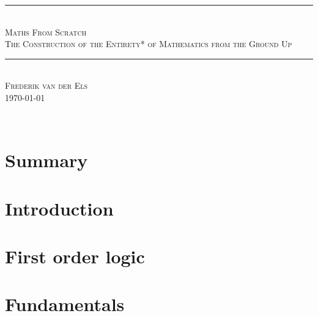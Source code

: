 \documentclass[11pt, a4paper]{report}
\theoremstyle{definition}
\begin{document}
\begin{titlepage}
    \newcommand{\HRule}{\rule{\linewidth}{0.5mm}}

    \begin{center}  
        \HRule \\[0.4cm]
        \textsc{\LARGE Maths From Scratch} \\[0.5cm]
        \textsc{\Large The Construction of the Entirety* of Mathematics from the Ground Up} \\[0.1cm]
        \HRule \\[1.5cm]

        {\large \textsc{Frederik van der Els}} \\[1.5cm]

        {\large \today} \\
    \end{center}
\end{titlepage}

\newpage
\thispagestyle{empty}
~

\chapter*{Summary}\label{chap:summary}


\newpage
\tableofcontents

\chapter*{Introduction}\label{chap:introduction}


\setcounter{chapter}{-1}
\chapter{First order logic}\label{chap:first_order_logic}


\chapter{Fundamentals}\label{chap:fundamentals}


\printbibliography[title={Bibliography}]

\appendix
\end{document}
